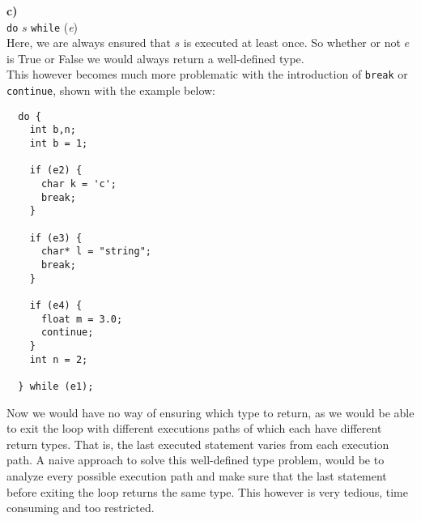 \textbf{c)}\\
\texttt{do} $s$ \texttt{while} (\textit{e})\\
Here, we are always ensured that $s$ is executed at least once. So whether or not $e$ is True or False we would always return a well-defined type.\\

This however becomes much more problematic with the introduction of \texttt{break} or \texttt{continue}, shown with the example below:
\begin{lstlisting}
  do {
    int b,n;
    int b = 1;

    if (e2) {
      char k = 'c';
      break;
    }

    if (e3) {
      char* l = "string";
      break;
    }

    if (e4) {
      float m = 3.0;
      continue;
    }
    int n = 2;

  } while (e1);
\end{lstlisting}

Now we would have no way of ensuring which type to return, as we would be able to exit the loop with different executions paths of which each have different return types. That is, the last executed statement varies from each execution path. A naive approach to solve this well-defined type problem, would be to analyze every possible execution path and make sure that the last statement before exiting the loop returns the same type. This however is very tedious, time consuming and too restricted.\\

